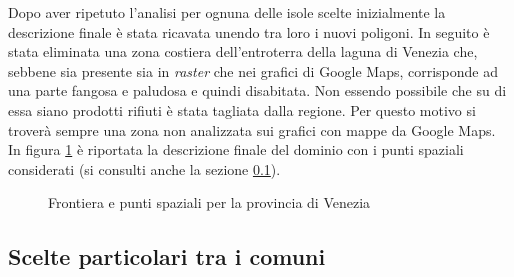 \documentclass[a4paper,11pt,twoside,openright]{book}							%
\begin{document}
Dopo aver ripetuto l'analisi per ognuna delle isole scelte inizialmente la descrizione finale è stata ricavata unendo tra loro i nuovi poligoni. In seguito è stata eliminata una zona costiera dell'entroterra della laguna di Venezia che, sebbene sia presente sia in \textit{raster} che nei grafici di Google Maps, corrisponde ad una parte fangosa e paludosa e quindi disabitata. Non essendo possibile che su di essa siano prodotti rifiuti è stata tagliata dalla regione. Per questo motivo si troverà sempre una zona non analizzata sui grafici con mappe da Google Maps. In figura \ref{fig:Ven_rgm} è riportata la descrizione finale del dominio con i punti spaziali considerati (si consulti anche la sezione \ref{sez:comunireplicati}).
\begin{figure}[t]
\centering
{}
\caption{Frontiera e punti spaziali per la provincia di Venezia}
\label{fig:Ven_rgm}
\end{figure}

\subsection{Scelte particolari tra i comuni}
\label{sez:comunireplicati}
\end{document}
